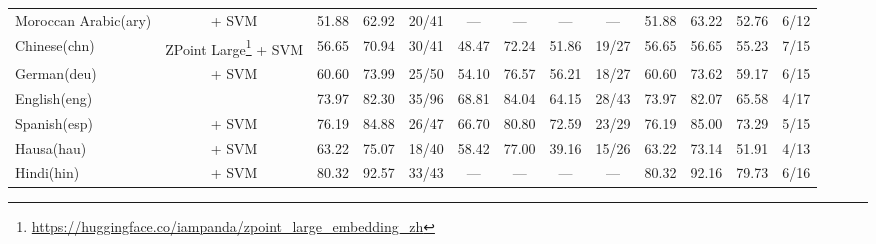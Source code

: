 \begin{table*}[h]
{\begin{tabular}{l|c|ccc|cccc|cccc}
            Moroccan Arabic(ary)                    & \citep{wang2024multilingual}   + SVM                                                         & 51.88                        & 62.92                        & 20/41                       & —             & —             & —                 & —             & 51.88         & 63.22         & 52.76             & 6/12          \\
            Chinese(chn)                            & ZPoint Large\footnote{\url{https://huggingface.co/iampanda/zpoint_large_embedding_zh}} + SVM & 56.65                        & 70.94                        & 30/41                       & 48.47         & 72.24         & 51.86             & 19/27         & 56.65         & 56.65         & 55.23             & 7/15          \\
            German(deu)                             & \citep{wang2024multilingual}       + SVM                                                     & 60.60                        & 73.99                        & 25/50                       & 54.10         & 76.57         & 56.21             & 18/27         & 60.60         & 73.62         & 59.17             & 6/15          \\
            English(eng)                            & \citep{zhang2025jasperstelladistillationsota}                                                & 73.97                        & 82.30                        & 35/96                       & 68.81         & 84.04         & 64.15             & 28/43         & 73.97         & 82.07         & 65.58             & 4/17          \\
            Spanish(esp)                            & \citep{wang2024multilingual}      + SVM                                                      & 76.19                        & 84.88                        & 26/47                       & 66.70         & 80.80         & 72.59             & 23/29         & 76.19         & 85.00         & 73.29             & 5/15          \\
            Hausa(hau)                              & \citep{dobler-demelo-2023-focus} + SVM                                                       & 63.22                        & 75.07                        & 18/40                       & 58.42         & 77.00         & 39.16             & 15/26         & 63.22         & 73.14         & 51.91             & 4/13          \\
            Hindi(hin)                              & \citep{wang2024multilingual}  + SVM                                                          & 80.32                        & 92.57                        & 33/43                       & —             & —             & —                 & —             & 80.32         & 92.16         & 79.73             & 6/16          \\

\end{tabular}}
\end{table*}
